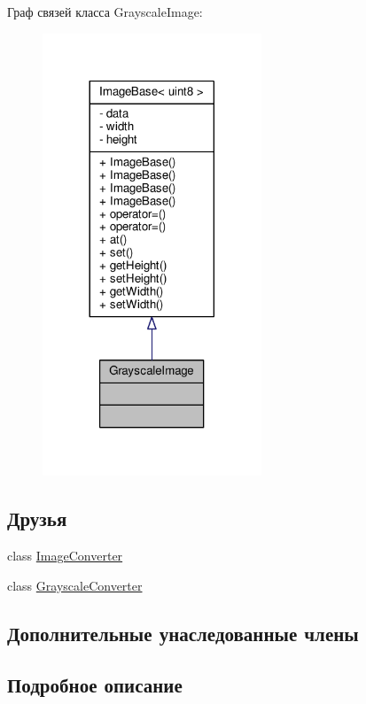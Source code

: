 Граф связей класса Grayscale\+Image\+:
\nopagebreak
\begin{figure}[H]
\begin{center}
\leavevmode
\includegraphics[width=185pt]{d6/d4d/class_grayscale_image__coll__graph}
\end{center}
\end{figure}
\subsection*{Друзья}
\begin{DoxyCompactItemize}
\item 
class \hyperlink{class_grayscale_image_a683b929065aaead03ccce450a7b4ab30}{Image\+Converter}
\item 
class \hyperlink{class_grayscale_image_a655e20b76703bb6a4e6ecd9ed4a5d9ed}{Grayscale\+Converter}
\end{DoxyCompactItemize}
\subsection*{Дополнительные унаследованные члены}


\subsection{Подробное описание}


